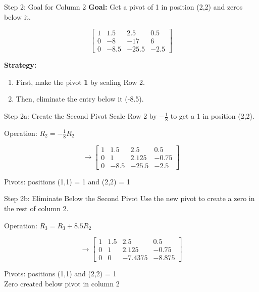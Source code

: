 \documentclass[aspectratio=169,xcolor=dvipsnames,svgnames,x11names,fleqn]{beamer}
\begin{document}
\begin{frame}{Step 2: Goal for Column 2}
\centering
\textbf{Goal:} Get a pivot of \alert{1} in position (2,2) and zeros below it.

$$
\left[\begin{array}{ccc|c}
1 & 1.5 & 2.5 & 0.5\\
0 & -8 & -17 & 6\\
0 & -8.5 & -25.5 & -2.5
\end{array}\right]
$$

\vspace{5mm}
\textbf{Strategy:}
\begin{enumerate}
    \item First, make the pivot \textbf{1} by scaling Row 2.
    \item Then, eliminate the entry below it (-8.5).
\end{enumerate}
\end{frame}

\begin{frame}{Step 2a: Create the Second Pivot}
\centering
Scale Row 2 by $-\frac{1}{8}$ to get a \alert{1} in position (2,2).

\vspace{3mm}
\alert{Operation:} $R_2 = -\frac{1}{8} R_2$

\vspace{3mm}
$$
\rightarrow \left[\begin{array}{ccc|c}
1 & 1.5 & 2.5 & 0.5\\
0 & 1 & 2.125 & -0.75\\
0 & -8.5 & -25.5 & -2.5
\end{array}\right]
$$

\vspace{3mm}
\colorbox{red!20}{Pivots: positions (1,1) = 1 and (2,2) = 1}
\end{frame}

\begin{frame}{Step 2b: Eliminate Below the Second Pivot}
\centering
Use the new pivot to create a \alert{zero} in the rest of column 2.

\vspace{3mm}
\alert{Operation:}
$R_3 = R_3 + 8.5R_2$

\vspace{3mm}
$$
\rightarrow \left[\begin{array}{ccc|c}
1 & 1.5 & 2.5 & 0.5\\
0 & 1 & 2.125 & -0.75\\
0 & 0 & -7.4375 & -8.875
\end{array}\right]
$$

\vspace{3mm}
\colorbox{red!20}{Pivots: positions (1,1) and (2,2) = 1} \\
\colorbox{blue!20}{Zero created below pivot in column 2}
\end{frame}
\end{document}
